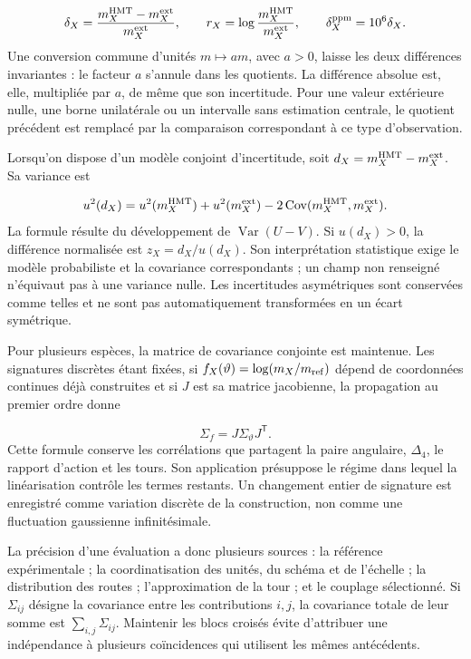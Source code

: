 \[
 \delta_X=\frac{m_X^{\rm HMT}-m_X^{\rm ext}}{m_X^{\rm ext}},
 \qquad r_X=\log\frac{m_X^{\rm HMT}}{m_X^{\rm ext}},
 \qquad \delta_X^{\rm ppm}=10^6\delta_X.
\]
Une conversion commune d’unités \(m\mapsto am\), avec \(a>0\),
laisse les deux différences invariantes : le facteur \(a\) s’annule dans les
quotients. La différence absolue est, elle, multipliée par \(a\), de même que
son incertitude. Pour une valeur extérieure nulle, une borne unilatérale ou un
intervalle sans estimation centrale, le quotient précédent est remplacé par
la comparaison correspondant à ce type d’observation.


Lorsqu’on dispose d’un modèle conjoint d’incertitude, soit
\(d_X=m_X^{\rm HMT}-m_X^{\rm ext}\). Sa variance est

\[
 u^2(d_X)=u^2(m_X^{\rm HMT})+u^2(m_X^{\rm ext})
          -2\operatorname{Cov}(m_X^{\rm HMT},m_X^{\rm ext}).
\]
La formule résulte du développement de
\(\operatorname{Var}(U-V)\). Si \(u(d_X)>0\), la différence
normalisée est \(z_X=d_X/u(d_X)\). Son interprétation statistique exige
le modèle probabiliste et la covariance correspondants ; un champ non
renseigné n’équivaut pas à une variance nulle. Les incertitudes asymétriques
sont conservées comme telles et ne sont pas automatiquement transformées en un écart
symétrique.


Pour plusieurs espèces, la matrice de covariance conjointe est maintenue. Les
signatures discrètes étant fixées, si \(f_X(\vartheta)=\log(m_X/m_{\rm ref})\)
dépend de coordonnées continues déjà construites et si \(J\) est sa matrice
jacobienne, la propagation au premier ordre donne

\[
 \Sigma_f=J\Sigma_\vartheta J^{\mathsf T}.
\]
Cette formule conserve les corrélations que partagent la paire angulaire,
\(\Delta_4\), le rapport d’action et les tours. Son application présuppose
le régime dans lequel la linéarisation contrôle les termes restants.
Un changement entier de signature est enregistré comme variation discrète de la
construction, non comme une fluctuation gaussienne infinitésimale.


La précision d’une évaluation a donc plusieurs sources : la
référence expérimentale ; la coordinatisation des unités, du schéma et de l’échelle ; la
distribution des routes ; l’approximation de la tour ; et le couplage
sélectionné. Si \(\Sigma_{ij}\) désigne la covariance entre les
contributions \(i,j\), la covariance totale de leur somme est
\(\sum_{i,j}\Sigma_{ij}\). Maintenir les blocs croisés évite
d’attribuer une indépendance à plusieurs coïncidences qui utilisent les mêmes
antécédents.



